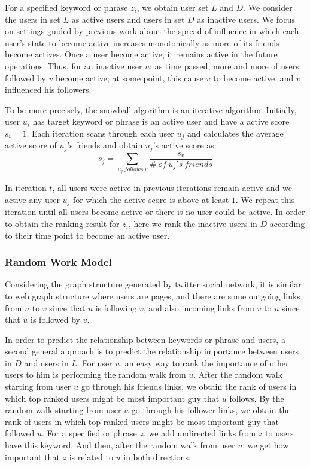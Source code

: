 \documentclass{article}
\begin{document}
For a specified keyword or phrase $z_i$, we obtain user set $L$ and $D$. We consider the users in set $L$ as active users and users in set $D$ as inactive users. We focus on settings guided by previous work about the spread of influence in which each user's state to become active increases monotonically as more of its friends become actives. Once a user become active, it remains active in the future operations. Thus, for an inactive user $u$: as time passed, more and more of users followed by $v$ become active; at some point, this cause $v$ to become active, and $v$ influenced his followers.

To be more precisely, the snowball algorithm is an iterative algorithm. Initially, user $u_i$ has target keyword or phrase is an active user and have a active score $s_i=1$. Each iteration scans through each user $u_j$ and calculates the average active score of $u_j$'s friends and obtain $u_j$'s active score as:
$$s_j = \sum_{u_j\ follows\ v} \frac{s_v}{\#\ of\ u_j's\ friends}$$

In iteration $t$, all users were active in previous iterations remain active and we active any user $u_j$ for which the active score is above at least $1$. We repeat this iteration until all users become active or there is no user could be active. In order to obtain the ranking result for $z_i$, here we rank the inactive users in $D$ according to their time point to become an active user.

\subsubsection{Random Work Model}
Considering the graph structure generated by twitter social network, it is similar to web graph structure where users are pages, and there are some outgoing links from $u$ to $v$ since that $u$ is following $v$, and also incoming links from $v$ to $u$ since that $u$ is followed by $v$.

In order to predict the relationship between keywords or phrase and users, a second general approach is to predict the relationship importance between users in $D$ and users in $L$. For user $u$, an easy way to rank the importance of other users to him is performing the random walk from $u$. After the random walk starting from user $u$ go through his friends links, we obtain the rank of users in which top ranked users might be most important guy that $u$ follows. By the random walk starting from user $u$ go through his follower links, we obtain the rank of users in which top ranked users might be most important guy that followed $u$. For a specified or phrase $z$, we add undirected links from $z$ to users have this keyword. And then, after the random walk from user $u$, we get how important that $z$ is related to $u$ in both directions.
\end{document}
